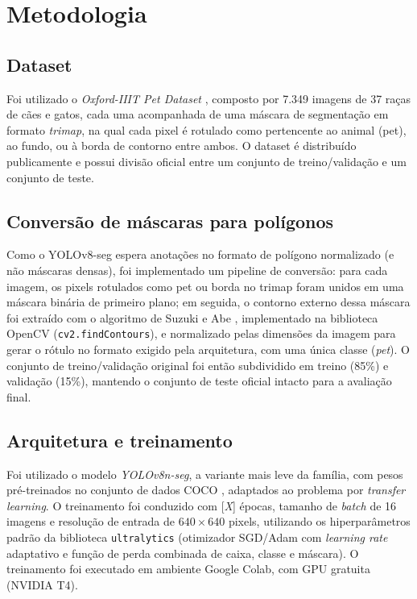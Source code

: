 \documentclass[12pt]{article}
\begin{document}
\section{Metodologia}
\label{sec:metodologia}

\subsection{Dataset}

Foi utilizado o \textit{Oxford-IIIT Pet Dataset} \cite{parkhi2012cats}, composto por 7.349
imagens de 37 raças de cães e gatos, cada uma acompanhada de uma máscara de segmentação em
formato \textit{trimap}, na qual cada pixel é rotulado como pertencente ao animal (pet), ao
fundo, ou à borda de contorno entre ambos. O dataset é distribuído publicamente e possui
divisão oficial entre um conjunto de treino/validação e um conjunto de teste.

\subsection{Conversão de máscaras para polígonos}

Como o YOLOv8-seg espera anotações no formato de polígono normalizado (e não máscaras
densas), foi implementado um pipeline de conversão: para cada imagem, os pixels rotulados
como pet ou borda no trimap foram unidos em uma máscara binária de primeiro plano; em
seguida, o contorno externo dessa máscara foi extraído com o algoritmo de
Suzuki e Abe \cite{suzuki1985contours}, implementado na biblioteca OpenCV
(\texttt{cv2.findContours}), e normalizado pelas dimensões da imagem para gerar o rótulo no
formato exigido pela arquitetura, com uma única classe (\textit{pet}). O conjunto de
treino/validação original foi então subdividido em treino (85\%) e validação (15\%),
mantendo o conjunto de teste oficial intacto para a avaliação final.

\subsection{Arquitetura e treinamento}

Foi utilizado o modelo \textit{YOLOv8n-seg}, a variante mais leve da família, com pesos
pré-treinados no conjunto de dados COCO \cite{lin2014coco}, adaptados ao problema por
\textit{transfer learning}. O treinamento foi conduzido com [\textit{X}] épocas, tamanho de
\textit{batch} de 16 imagens e resolução de entrada de $640\times640$ pixels, utilizando os
hiperparâmetros padrão da biblioteca \texttt{ultralytics} (otimizador SGD/Adam com
\textit{learning rate} adaptativo e função de perda combinada de caixa, classe e máscara). O
treinamento foi executado em ambiente Google Colab, com GPU gratuita (NVIDIA T4).
\end{document}
